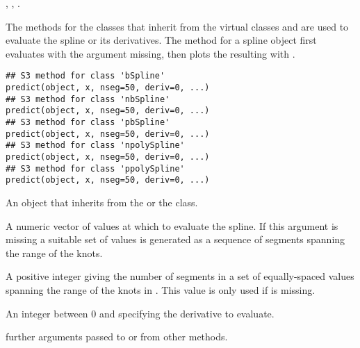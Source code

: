 %
\begin{SeeAlso}\relax
{}, , .
\end{SeeAlso}
%
\begin{Examples}
\end{Examples}
%
\begin{Description}\relax
The  methods for the classes that inherit from the
virtual classes  and  are used to
evaluate the spline or its derivatives.  The  method for a
spline object first evaluates  with the 
argument missing, then plots the resulting  with
.
\end{Description}
%
\begin{Usage}
\begin{verbatim}
## S3 method for class 'bSpline'
predict(object, x, nseg=50, deriv=0, ...)
## S3 method for class 'nbSpline'
predict(object, x, nseg=50, deriv=0, ...)
## S3 method for class 'pbSpline'
predict(object, x, nseg=50, deriv=0, ...)
## S3 method for class 'npolySpline'
predict(object, x, nseg=50, deriv=0, ...)
## S3 method for class 'ppolySpline'
predict(object, x, nseg=50, deriv=0, ...)
\end{verbatim}
\end{Usage}
%
\begin{Arguments}
\begin{ldescription}
\item[\code{object}] An object that inherits from the  or the
 class.
\item[\code{x}] A numeric vector of  values at which to evaluate the
spline.  If this argument is missing a suitable set of 
values is generated as a sequence of  segments spanning
the range of the knots.
\item[\code{nseg}] A positive integer giving the number of segments in a set
of equally-spaced  values spanning the range of the knots
in .  This value is only used if  is missing.
\item[\code{deriv}] An integer between 0 and 
specifying the derivative to evaluate.
\item[\code{...}] further arguments passed to or from other methods.
\end{ldescription}
\end{Arguments}
